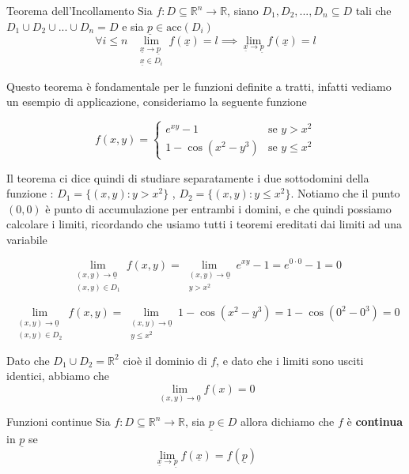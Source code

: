\documentclass{rapport}
\begin{document}
\begin{proposizione}{Teorema dell'Incollamento}{}
  Sia $f:D \subseteq \mathbb{R}^n\to \mathbb{R}$, siano $D_1, D_2, ..., D_n \subseteq D$ tali che $D_1 \cup D_2 \cup ...  \cup D_n = D$ e sia $\underline{p} \in \text{acc}(D_i)$ 
  \[
  \forall i \leq n \;\; \lim_{\substack{\underline{x}\to\underline{p} \\ \underline{x} \in D_i}} f(\underline{x}) = l \implies  \lim_{\underline{x}\to\underline{p}} f(\underline{x}) = l
  \]
\end{proposizione}


Questo teorema è fondamentale per le funzioni definite a tratti, infatti vediamo un esempio di applicazione, consideriamo la seguente funzione 

\[
f(x,y) = \begin{cases}
  e^{xy} - 1  & \text{se } y>x^2 \\
  1-\cos (x^2-y^3) & \text{se } y \leq x^2
\end{cases}
\]

Il teorema ci dice quindi di studiare separatamente i due sottodomini della funzione : $D_1 = \{(x,y): y>x^2\}$ , $D_2 = \{(x,y): y\leq x^2\}$. Notiamo che il punto $(0,0)$ è punto di accumulazione per entrambi i domini, e che quindi possiamo calcolare i limiti, ricordando che usiamo tutti i teoremi ereditati dai limiti ad una variabile 

\[
 \lim_{\substack{(x,y)\to\underline{0} \\ (x,y) \in D_1}} f(x, y) =  \lim_{\substack{(x,y)\to\underline{0} \\ y > x^2}}   e^{xy} - 1  = e^{0\cdot 0 } -1 = 0 
\]


\[
 \lim_{\substack{(x,y)\to\underline{0} \\ (x,y) \in D_2}} f(x, y) =  \lim_{\substack{(x,y)\to\underline{0} \\ y \leq x^2}}   1-\cos (x^2-y^3) = 1-\cos (0^2-0^3)=0 
\]

Dato che $D_1 \cup D_2 = \mathbb{R}^2$ cioè il dominio di $f$, e dato che i limiti sono usciti identici, abbiamo che 
\[
\lim_{(x,y)\to\underline{0} } f(x) = 0
\]

\begin{definizione}{Funzioni continue}{}
   Sia $f:D\subseteq \mathbb{R}^n \to \mathbb{R}$, sia $\underline{p} \in D$ allora dichiamo che $f$ è \textbf{continua} in $\underline{p}$ se 
   \[
   \lim_{\underline{x} \to \underline{p}} f(\underline{x}) = f(\underline{p}) 
   \]
\end{definizione}
\end{document}
